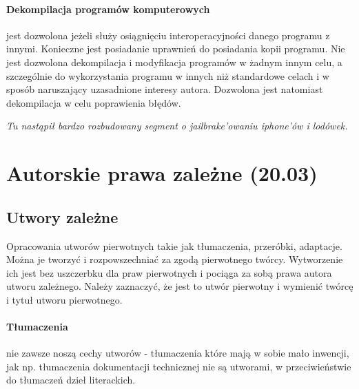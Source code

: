\documentclass{article}
\begin{document}
\paragraph{Dekompilacja programów komputerowych}
jest dozwolona jeżeli służy osiągnięciu interoperacyjności danego programu z innymi.
Konieczne jest posiadanie uprawnień do posiadania kopii programu.
Nie jest dozwolona dekompilacja i modyfikacja programów w żadnym innym celu,
a szczególnie do wykorzystania programu w innych niż standardowe celach i w sposób naruszający uzasadnione interesy autora.
Dozwolona jest natomiast dekompilacja w celu poprawienia błędów.

\textit {
Tu nastąpił bardzo rozbudowany segment o jailbrake'owaniu iphone'ów i lodówek.
}

\section{Autorskie prawa zależne (20.03)}

\subsection{Utwory zależne}
Opracowania utworów pierwotnych takie jak tłumaczenia, przeróbki, adaptacje.
Można je tworzyć i rozpowszechniać za zgodą pierwotnego twórcy.
Wytworzenie ich jest bez uszczerbku dla praw pierwotnych i pociąga za sobą prawa autora utworu zależnego.
Należy zaznaczyć, że jest to utwór pierwotny i wymienić twórcę i tytuł utworu pierwotnego.

\paragraph{Tłumaczenia}
nie zawsze noszą cechy utworów - tłumaczenia które mają w sobie mało inwencji,
jak np. tłumaczenia dokumentacji technicznej nie są utworami, w przeciwieństwie do tłumaczeń dzieł literackich.
\end{document}
